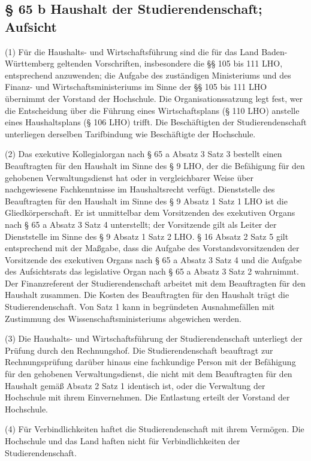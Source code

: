 \documentclass[
10pt,
a4paper,
twoside,								%
titlepage=false,							%
draft=false								%
]{scrartcl}
\begin{document}
\subsection{§ 65 b Haushalt der Studierendenschaft; Aufsicht}

(1) Für die Haushalts- und Wirtschaftsführung  sind die für das Land Baden-Württemberg geltenden Vorschriften,  insbesondere die §§ 105 bis 111  LHO, entsprechend anzuwenden; die Aufgabe des zuständigen Ministeriums  und des Finanz- und Wirtschaftsministeriums im Sinne der §§ 105 bis 111  LHO übernimmt der Vorstand der Hochschule. Die Organisationssatzung  legt fest, wer die Entscheidung über die Führung eines Wirtschaftsplans  (§ 110  LHO) anstelle eines Haushaltsplans (§ 106  LHO) trifft. Die Beschäftigten der Studierendenschaft unterliegen  derselben Tarifbindung wie Beschäftigte der Hochschule.

(2) Das exekutive Kollegialorgan nach § 65 a  Absatz 3 Satz 3 bestellt einen Beauftragten für den Haushalt im Sinne  des § 9  LHO, der die Befähigung für den gehobenen Verwaltungsdienst hat oder in  vergleichbarer Weise über nachgewiesene Fachkenntnisse im  Haushaltsrecht verfügt. Dienststelle des Beauftragten für den Haushalt  im Sinne des § 9  Absatz 1 Satz 1 LHO ist die Gliedkörperschaft. Er ist unmittelbar dem  Vorsitzenden des exekutiven Organs nach § 65 a Absatz 3 Satz 4  unterstellt; der Vorsitzende gilt als Leiter der Dienststelle im Sinne  des § 9  Absatz 1 Satz 2 LHO. § 16 Absatz 2 Satz 5 gilt entsprechend mit der  Maßgabe, dass die Aufgabe des Vorstandsvorsitzenden der Vorsitzende des  exekutiven Organs nach § 65 a Absatz 3 Satz 4 und die Aufgabe des  Aufsichtsrats das legislative Organ nach § 65 a Absatz 3 Satz 2  wahrnimmt. Der Finanzreferent der Studierendenschaft arbeitet mit dem  Beauftragten für den Haushalt zusammen. Die Kosten des Beauftragten für  den Haushalt trägt die Studierendenschaft. Von Satz 1 kann in  begründeten Ausnahmefällen mit Zustimmung des Wissenschaftsministeriums  abgewichen werden.

(3) Die Haushalts- und Wirtschaftsführung der  Studierendenschaft unterliegt der Prüfung durch den Rechnungshof. Die  Studierendenschaft beauftragt zur Rechnungsprüfung darüber hinaus eine  fachkundige Person mit der Befähigung für den gehobenen  Verwaltungsdienst, die nicht mit dem Beauftragten für den Haushalt gemäß  Absatz 2 Satz 1 identisch ist, oder die Verwaltung der Hochschule mit  ihrem Einvernehmen. Die Entlastung erteilt der Vorstand der Hochschule.

(4) Für Verbindlichkeiten haftet die  Studierendenschaft mit ihrem Vermögen. Die Hochschule und das Land  haften nicht für Verbindlichkeiten der Studierendenschaft.
\end{document}
